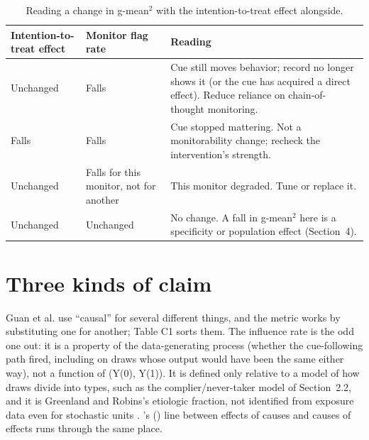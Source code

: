 \documentclass[11pt,a4paper]{article}
\begin{document}
\begin{table}[H]
  \centering\small
  \begin{tabularx}{\linewidth}{@{}>{\raggedright\arraybackslash}p{2.4cm}>{\raggedright\arraybackslash}p{2.2cm}X@{}}
    \toprule
    Intention-to-treat effect & Monitor flag rate & Reading \\
    \midrule
    Unchanged & Falls & Cue still moves behavior; record no longer shows it (or the cue has acquired a direct effect). Reduce reliance on chain-of-thought monitoring. \\ \addlinespace[3pt]
    Falls & Falls & Cue stopped mattering. Not a monitorability change; recheck the intervention’s strength. \\ \addlinespace[3pt]
    Unchanged & Falls for this monitor, not for another & This monitor degraded. Tune or replace it. \\ \addlinespace[3pt]
    Unchanged & Unchanged & No change. A fall in g-mean$^2$ here is a specificity or population effect (Section~4). \\
    \bottomrule
  \end{tabularx}
  \caption{Reading a change in g-mean$^2$ with the intention-to-treat effect alongside.}
\end{table}


\setcounter{section}{2}
\section{Three kinds of claim}
Guan et al. use “causal” for several different things, and the metric works by substituting one for another; Table C1 sorts them. The influence rate is the odd one out: it is a property of the data-generating process (whether the cue-following path fired, including on draws whose output would have been the same either way), not a function of (Y(0), Y(1)). It is defined only relative to a model of how draws divide into types, such as the complier/never-taker model of Section~2.2, and it is Greenland and Robins’s etiologic fraction, not identified from exposure data even for stochastic units \citep{robins1989probability}. \citeauthor{holland1986statistics}’s (\citeyear{holland1986statistics}) line between effects of causes and causes of effects runs through the same place.
\end{document}
